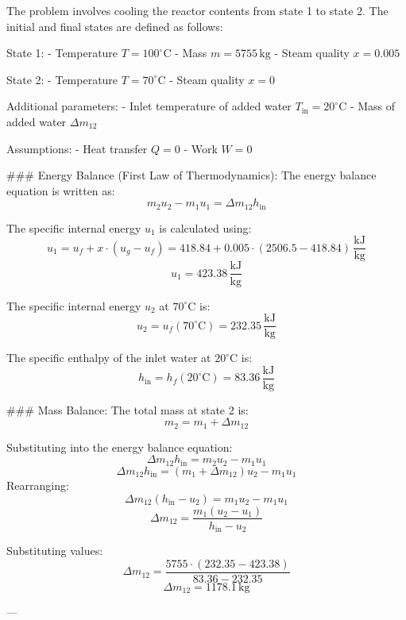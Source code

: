 The problem involves cooling the reactor contents from state 1 to state 2. The initial and final states are defined as follows:  

State 1:  
- Temperature \( T = 100^\circ\text{C} \)  
- Mass \( m = 5755 \, \text{kg} \)  
- Steam quality \( x = 0.005 \)  

State 2:  
- Temperature \( T = 70^\circ\text{C} \)  
- Steam quality \( x = 0 \)  

Additional parameters:  
- Inlet temperature of added water \( T_{\text{in}} = 20^\circ\text{C} \)  
- Mass of added water \( \Delta m_{12} \)  

Assumptions:  
- Heat transfer \( Q = 0 \)  
- Work \( W = 0 \)  

### Energy Balance (First Law of Thermodynamics):  
The energy balance equation is written as:  
\[
m_2 u_2 - m_1 u_1 = \Delta m_{12} h_{\text{in}}
\]  

The specific internal energy \( u_1 \) is calculated using:  
\[
u_1 = u_f + x \cdot (u_g - u_f) = 418.84 + 0.005 \cdot (2506.5 - 418.84) \, \frac{\text{kJ}}{\text{kg}}
\]  
\[
u_1 = 423.38 \, \frac{\text{kJ}}{\text{kg}}
\]  

The specific internal energy \( u_2 \) at \( 70^\circ\text{C} \) is:  
\[
u_2 = u_f(70^\circ\text{C}) = 232.35 \, \frac{\text{kJ}}{\text{kg}}
\]  

The specific enthalpy of the inlet water at \( 20^\circ\text{C} \) is:  
\[
h_{\text{in}} = h_f(20^\circ\text{C}) = 83.36 \, \frac{\text{kJ}}{\text{kg}}
\]  

### Mass Balance:  
The total mass at state 2 is:  
\[
m_2 = m_1 + \Delta m_{12}
\]  

Substituting into the energy balance equation:  
\[
\Delta m_{12} h_{\text{in}} = m_2 u_2 - m_1 u_1
\]  
\[
\Delta m_{12} h_{\text{in}} = (m_1 + \Delta m_{12}) u_2 - m_1 u_1
\]  
Rearranging:  
\[
\Delta m_{12} (h_{\text{in}} - u_2) = m_1 u_2 - m_1 u_1
\]  
\[
\Delta m_{12} = \frac{m_1 (u_2 - u_1)}{h_{\text{in}} - u_2}
\]  

Substituting values:  
\[
\Delta m_{12} = \frac{5755 \cdot (232.35 - 423.38)}{83.36 - 232.35}
\]  
\[
\Delta m_{12} = 1178.1 \, \text{kg}
\]  

---